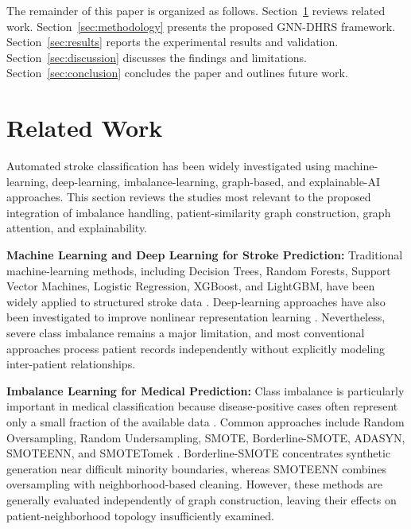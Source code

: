 \documentclass[pdflatex,sn-mathphys-num]{sn-jnl}%
\theoremstyle{thmstyleone}%
\theoremstyle{thmstyletwo}%
\theoremstyle{thmstylethree}%
\begin{document}
The remainder of this paper is organized as follows.
Section~\ref{sec:relatedwork} reviews related work.
Section~\ref{sec:methodology} presents the proposed GNN-DHRS framework.
Section~\ref{sec:results} reports the experimental results and validation.
Section~\ref{sec:discussion} discusses the findings and limitations.
Section~\ref{sec:conclusion} concludes the paper and outlines future work.
\section{Related Work}
\label{sec:relatedwork}

Automated stroke classification has been widely investigated using
machine-learning, deep-learning, imbalance-learning, graph-based, and
explainable-AI approaches. This section reviews the studies most relevant to
the proposed integration of imbalance handling, patient-similarity graph
construction, graph attention, and explainability.

\textbf{Machine Learning and Deep Learning for Stroke Prediction: }
Traditional machine-learning methods, including Decision Trees, Random
Forests, Support Vector Machines, Logistic Regression, XGBoost, and LightGBM,
have been widely applied to structured stroke data
\cite{johnson2023stroke,tashkova2025comparative,melnykova2025stroke}.
Deep-learning approaches have also been investigated to improve nonlinear
representation learning \cite{akib2025optimizing,kanwal2025stroke}.
Nevertheless, severe class imbalance remains a major limitation, and most
conventional approaches process patient records independently without
explicitly modeling inter-patient relationships.

\textbf{Imbalance Learning for Medical Prediction:}
Class imbalance is particularly important in medical classification because
disease-positive cases often represent only a small fraction of the available
data \cite{he2009learning,haixiang2017learning}. Common approaches include
Random Oversampling, Random Undersampling, SMOTE, Borderline-SMOTE, ADASYN,
SMOTEENN, and SMOTETomek
\cite{chawla2002smote,han2005borderline,he2008adasyn,batista2004study,
batista2003balancing,abousaber2025robust}. Borderline-SMOTE concentrates
synthetic generation near difficult minority boundaries, whereas SMOTEENN
combines oversampling with neighborhood-based cleaning. However, these
methods are generally evaluated independently of graph construction, leaving
their effects on patient-neighborhood topology insufficiently examined.
\end{document}
